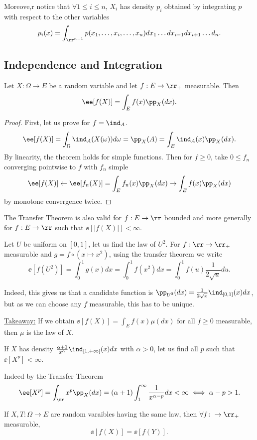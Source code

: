 \documentclass[../main.tex]{subfiles}
\begin{document}
Moreove,r notice that $\forall 1 \leq i \leq n$, $X_i$ has density
$p_i$ obtained by integrating $p$ with respect to the other variables
\[
  p_i(x) = \int_{\rr^{n-1}} p(x_1, \ldots, x_i, \ldots, x_n)dx_1
  \ldots dx_{i-1} dx_{i+1} \ldots d_n
.\] 

\subsection{Independence and Integration}
\begin{theorem}
  Let $X \colon \Omega \to E$ be a random variable and let $f: E \to
  \rr_+$ measurable. Then
  \[
    \ee[f(X)] = \int_{E}f(x)\pp_X(dx)
  .\] 
\end{theorem}
\begin{proof}
    First, let us prove for $f = \ind_A$.
    \[
      \ee[f(X)] = \int_{\Omega} \ind_A(X(\omega)) d\omega = \pp_X(A) =
      \int_{E} \ind_A(x)\pp_X(dx)
    .\] 
  By linearity, the theorem holds for simple functions. Then for $f
  \geq 0$, take $0 \leq f_n $ converging pointwise to $f$ with $f_n$
  simple
  \[
    \ee[f(X)] \gets \ee[f_n(X)] = \int_{E}f_n(x)\pp_{X}(dx) \to \int_E
    f(x) \pp_X(dx)
  \]
  by monotone convergence twice.
\end{proof}
\begin{remark}
    The Transfer Theorem is also valid for $f: E \to \rr$ bounded and more
    generally for $f: E \to \rr$ such that $\ee[|f(X)|] < \infty$.
\end{remark}

\begin{application}
  Let $U$ be uniform on $[0, 1]$, let us find the law of $U^2$. For
  $f: \rr \to \rr_+$ measurable and $g = f \circ (x \mapsto x^2)$, 
  using the transfer theorem we write
  \[
    \ee[f(U^2)] = \int_{0}^1 g(x)dx = \int_{0}^1 f(x^2)dx = \int_{0}^1
    f(u) \frac{1}{2\sqrt{u}}du 
  .\] 

  Indeed, this gives us that a candidate function is
  $\pp_{U^2}(dx) = \frac{1}{2\sqrt{x}}\ind_{[0,1]}(x)dx $, but as we
  can choose any $f$ measurable, this has to be unique.
\end{application}

\underline{\sffamily Takeaway:} If we obtain $\ee[f(X)] = \int_{E}f(x)
\mu(dx)$ for all $f \geq 0$ measurable, then $\mu$ is the law of $X$.

\begin{example}
  If $X$ has density $\frac{\alpha + 1}{x^{\alpha}} \ind_{[1,
  +\infty[}(x)dx $ with $\alpha > 0$, let us find all $p$ such that
  $\ee[X^p] < \infty$.

  \vspace{0.3em}

  \noindent Indeed by the Transfer Theorem
  \[
    \ee[X^p] = \int_{\rr} x^p \pp_X(dx) = (\alpha + 1) \int_{1}^\infty
    \frac{1}{x^{\alpha - p}}dx < \infty \iff \alpha - p > 1
  .\] 
\end{example}

\begin{corollary}
    If $X, T \colon \Omega \to E$ are random varaibles having the same
    law, then $\forall f \colon \to \rr_{+}$ measurable,
    \[
      \ee[f(X)] = \ee[f(Y)]
    .\] 
\end{corollary}
\end{document}
